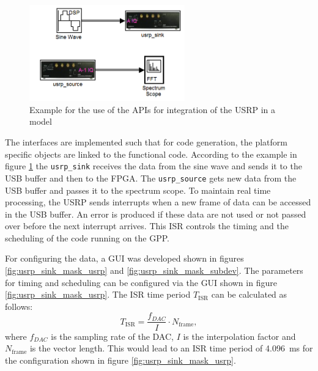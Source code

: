 \begin{figure}[htbp]
	\centering
		\includegraphics[width=0.6\textwidth]{../kapitel03/figures/usrp_sink_source.PNG}
	\caption{Example for the use of the APIs for integration of the USRP in a model}
	\label{fig:usrp_sink_source}
\end{figure}

The interfaces are implemented such that for code generation, the platform specific objects are linked to the functional code. According to the example in figure \ref{fig:usrp_sink_source} the \texttt{usrp\_sink} receives the data from the sine wave and sends it to the USB buffer and then to the FPGA. The \texttt{usrp\_source} gets new data from the USB buffer and passes it to the spectrum scope. To maintain real time processing, the USRP sends interrupts when a new frame of data can be accessed in the USB buffer. An error is produced if these data are not used or not passed over before the next interrupt arrives. This \ac{ISR} controls the timing and the scheduling of the code running on the GPP.

For configuring the data, a \ac{GUI} was developed shown in figures \ref{fig:usrp_sink_mask_usrp} and \ref{fig:usrp_sink_mask_subdev}. The parameters for timing and scheduling can be configured via the GUI shown in figure \ref{fig:usrp_sink_mask_usrp}. The \ac{ISR} time period $T_{\text{ISR}}$ can be calculated as follows:
\begin{equation}
	T_{\text{ISR}} = \frac{f_{DAC}}{I} \cdot N_{\text{frame}},
\end{equation}
where $f_{DAC}$ is the sampling rate of the DAC, $I$ is the interpolation factor and $N_{\text{frame}}$ is the vector length.
This would lead to an \ac{ISR} time period of \SI{4.096}{ms} for the configuration shown in figure \ref{fig:usrp_sink_mask_usrp}.
 

